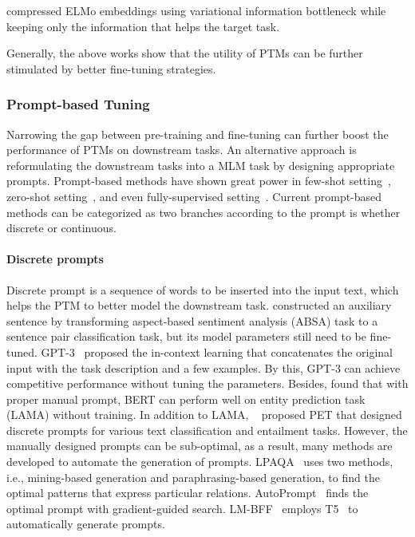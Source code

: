 \documentclass[fleqn]{SCYE-arxiv}
\begin{document}
\begin{multicols}{2}
\citet{li-eisner-2019-specializing} compressed ELMo embeddings using variational information bottleneck while keeping only the information that helps the target task.


Generally, the above works show that the utility of PTMs can be further stimulated by better fine-tuning strategies.



\subsubsection{Prompt-based Tuning}
Narrowing the gap between pre-training and fine-tuning can further boost the performance of PTMs on downstream tasks. An alternative approach is reformulating the downstream tasks into a MLM task by designing appropriate prompts. Prompt-based methods have shown great power in few-shot setting~\cite{Scao2021How,Schick2021Exploting,Schick2021PET,Gao2020LMBFF}, zero-shot setting~\cite{petroni2019language,Jiang2020How}, and even fully-supervised setting~\cite{Li2021Prefix,Liu2021PTuning}. Current prompt-based methods can be categorized as two branches according to the prompt is whether discrete or continuous.

\paragraph{Discrete prompts} Discrete prompt is a sequence of words to be inserted into the input text, which helps the PTM to better model the downstream task. 
\citet{sun2019utilizing} constructed an auxiliary sentence by transforming aspect-based sentiment analysis (ABSA) task to a sentence pair classification task, but its model parameters still need to be fine-tuned. 
GPT-3~\cite{Brown2020GPT3} proposed the in-context learning that concatenates the original input with the task description and a few examples. By this, GPT-3 can achieve competitive performance without tuning the parameters. Besides, \citet{petroni2019language} found that with proper manual prompt, BERT can perform well on entity prediction task (LAMA) without training. In addition to LAMA, ~\citet{Schick2021Exploting,Schick2021PET} proposed PET that designed discrete prompts for various text classification and entailment tasks. However, the manually designed prompts can be sub-optimal, as a result, many methods are developed to automate the generation of prompts. LPAQA~\cite{Jiang2020How} uses two methods, i.e., mining-based generation and paraphrasing-based generation, to find the optimal patterns that express particular relations. AutoPrompt~\cite{Shin2020AutoPrompt} finds the optimal prompt with gradient-guided search. LM-BFF~\cite{Gao2020LMBFF} employs T5~\cite{raffel2019t5} to automatically generate prompts.


\end{multicols}
\end{document}
